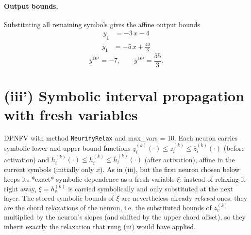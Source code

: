 \documentclass[11pt]{article}
\begin{document}
\paragraph{Output bounds.}
Substituting all remaining symbols gives the affine output bounds
\begin{align*}
\underline{y}_{1} &= -3\,x - 4
\end{align*}
\begin{align*}
\overline{y}_{1} &= -5\,x + \frac{40}{3}
\end{align*}
\begin{equation*}
\underline{y}^{\text{DP}} = -7, \qquad \overline{y}^{\text{DP}} = \frac{55}{3}.
\end{equation*}

\section{(iii') Symbolic interval propagation with fresh variables}
DPNFV with method \texttt{NeurifyRelax} and max\_vars = 10. Each neuron carries symbolic lower and upper bound functions
$\underline{z}^{(k)}_i(\cdot) \le z^{(k)}_i \le \overline{z}^{(k)}_i(\cdot)$ (before activation)
and $\underline{h}^{(k)}_i(\cdot) \le h^{(k)}_i \le \overline{h}^{(k)}_i(\cdot)$ (after activation),
affine in the current symbols (initially only $x$).
As in (iii), but the first neuron chosen below keeps its *exact*
symbolic dependence as a fresh variable $\xi$: instead of relaxing it right away, $\xi = h^{(k)}_v$
is carried symbolically and only substituted at the next layer. The stored symbolic bounds of $\xi$
are nevertheless already \emph{relaxed} ones: they are the chord relaxations of the neuron, i.e.
the substituted bounds of $z^{(k)}_v$ multiplied by the neuron's slopes (and shifted by the upper
chord offset), so they inherit exactly the relaxation that rung (iii) would have applied.
\end{document}
